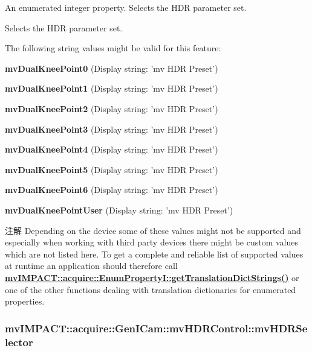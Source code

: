 An enumerated integer property. Selects the H\+D\+R parameter set. 

Selects the H\+D\+R parameter set.

The following string values might be valid for this feature\+:
\begin{DoxyItemize}
\item {\bfseries mv\+Dual\+Knee\+Point0} (Display string\+: 'mv H\+D\+R Preset')
\item {\bfseries mv\+Dual\+Knee\+Point1} (Display string\+: 'mv H\+D\+R Preset')
\item {\bfseries mv\+Dual\+Knee\+Point2} (Display string\+: 'mv H\+D\+R Preset')
\item {\bfseries mv\+Dual\+Knee\+Point3} (Display string\+: 'mv H\+D\+R Preset')
\item {\bfseries mv\+Dual\+Knee\+Point4} (Display string\+: 'mv H\+D\+R Preset')
\item {\bfseries mv\+Dual\+Knee\+Point5} (Display string\+: 'mv H\+D\+R Preset')
\item {\bfseries mv\+Dual\+Knee\+Point6} (Display string\+: 'mv H\+D\+R Preset')
\item {\bfseries mv\+Dual\+Knee\+Point\+User} (Display string\+: 'mv H\+D\+R Preset')
\end{DoxyItemize}

\begin{DoxyNote}{注解}
Depending on the device some of these values might not be supported and especially when working with third party devices there might be custom values which are not listed here. To get a complete and reliable list of supported values at runtime an application should therefore call {\bfseries \hyperlink{classmv_i_m_p_a_c_t_1_1acquire_1_1_enum_property_i_a0ba6ccbf5ee69784d5d0b537924d26b6}{mv\+I\+M\+P\+A\+C\+T\+::acquire\+::\+Enum\+Property\+I\+::get\+Translation\+Dict\+Strings()}} or one of the other functions dealing with translation dictionaries for enumerated properties. 
\end{DoxyNote}
\hypertarget{classmv_i_m_p_a_c_t_1_1acquire_1_1_gen_i_cam_1_1mv_h_d_r_control_a628e8bac6c8ed2e28342d9b1b03ddb56}{
\subsubsection[{mv\+H\+D\+R\+Selector}]{ mv\+I\+M\+P\+A\+C\+T\+::acquire\+::\+Gen\+I\+Cam\+::mv\+H\+D\+R\+Control\+::mv\+H\+D\+R\+Selector}}\label{classmv_i_m_p_a_c_t_1_1acquire_1_1_gen_i_cam_1_1mv_h_d_r_control_a628e8bac6c8ed2e28342d9b1b03ddb56}


